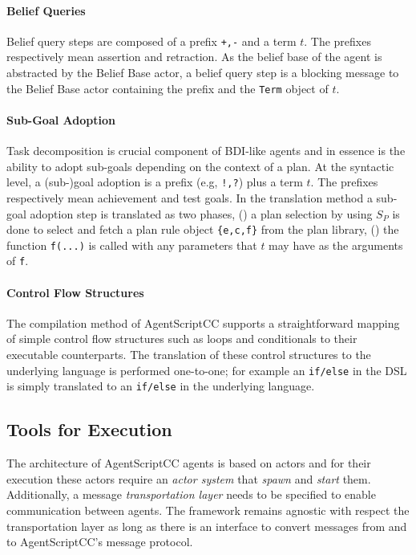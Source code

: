 \paragraph{Belief Queries}
Belief query steps are composed of a prefix \verb|+,-| and a term $t$. The prefixes respectively mean assertion and retraction. As the belief base of the agent is abstracted by the Belief Base actor, a belief query step is a blocking message to the Belief Base actor containing the prefix and the \verb+Term+ object of $t$.

\paragraph{Sub-Goal Adoption}
Task decomposition is crucial component of BDI-like agents and in essence is the ability to adopt sub-goals depending on the context of a plan. At the syntactic level, a (sub-)goal adoption is a prefix (e.g, \verb+!,?+) plus a term $t$. The prefixes respectively mean achievement and test goals. In the translation method a sub-goal adoption step is translated as two phases, () a plan selection by using $S_P$ is done to select and fetch a plan rule object \verb+{e,c,f}+ from the plan library, () the function \verb+f(...)+ is called with any parameters that $t$ may have as the arguments of \verb+f+.

\paragraph{Control Flow Structures}
The compilation method of AgentScriptCC supports a  straightforward mapping of simple control flow structures such as loops and conditionals to their executable counterparts. The translation of these control structures to the underlying language is performed one-to-one; for example an \verb+if/else+ in the DSL is simply translated to an \verb+if/else+ in the underlying language.

\subsection{Tools for Execution}
The architecture of AgentScriptCC agents is based on actors and for their execution these actors require an \textit{actor system} that \textit{spawn} and \textit{start} them. Additionally, a message \textit{transportation layer} needs to be specified to enable communication between agents. The framework remains agnostic with respect the transportation layer as long as there is an interface to convert messages from and to AgentScriptCC's message protocol.

